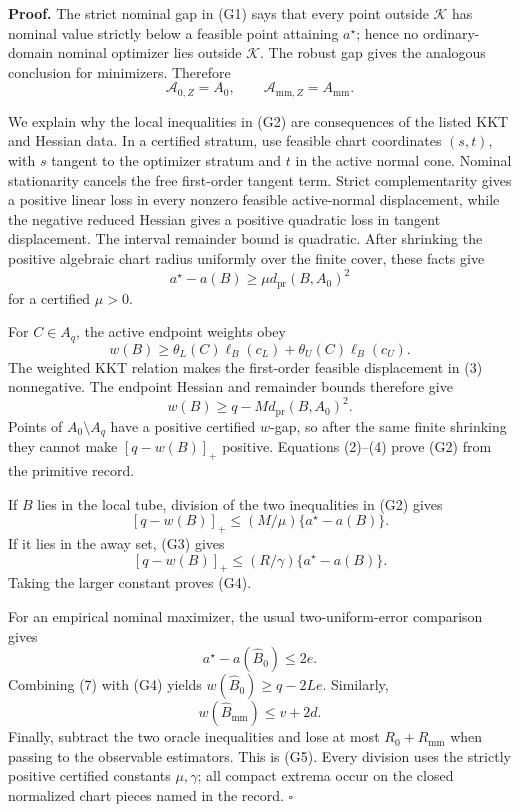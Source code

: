 \textbf{Proof.}
The strict nominal gap in (G1) says that every point outside \(\mathcal K\) has nominal value strictly below a feasible point attaining \(a^\star\); hence no ordinary-domain nominal optimizer lies outside \(\mathcal K\).  The robust gap gives the analogous conclusion for minimizers.  Therefore
\[
\mathcal A_{0,Z}=A_0,
\qquad
\mathcal A_{\mathrm{mm},Z}=A_{\mathrm{mm}}.
\tag{1}
\]

We explain why the local inequalities in (G2) are consequences of the listed KKT and Hessian data.  In a certified stratum, use feasible chart coordinates \((s,t)\), with \(s\) tangent to the optimizer stratum and \(t\) in the active normal cone.  Nominal stationarity cancels the free first-order tangent term.  Strict complementarity gives a positive linear loss in every nonzero feasible active-normal displacement, while the negative reduced Hessian gives a positive quadratic loss in tangent displacement.  The interval remainder bound is quadratic.  After shrinking the positive algebraic chart radius uniformly over the finite cover, these facts give
\[
a^\star-a(B)\ge\mu d_{\mathrm{pr}}(B,A_0)^2
\tag{2}
\]
for a certified \(\mu>0\).

For \(C\in A_q\), the active endpoint weights obey
\[
w(B)\ge\theta_L(C)\ell_B(c_L)+\theta_U(C)\ell_B(c_U).
\tag{3}
\]
The weighted KKT relation makes the first-order feasible displacement in (3) nonnegative.  The endpoint Hessian and remainder bounds therefore give
\[
w(B)\ge q-Md_{\mathrm{pr}}(B,A_0)^2.
\tag{4}
\]
Points of \(A_0\setminus A_q\) have a positive certified \(w\)-gap, so after the same finite shrinking they cannot make \([q-w(B)]_+\) positive.  Equations (2)--(4) prove (G2) from the primitive record.

If \(B\) lies in the local tube, division of the two inequalities in (G2) gives
\[
[q-w(B)]_+\le(M/\mu)\{a^\star-a(B)\}.
\tag{5}
\]
If it lies in the away set, (G3) gives
\[
[q-w(B)]_+\le(R/\gamma)\{a^\star-a(B)\}.
\tag{6}
\]
Taking the larger constant proves (G4).

For an empirical nominal maximizer, the usual two-uniform-error comparison gives
\[
a^\star-a(\widehat B_0)\le2e.
\tag{7}
\]
Combining (7) with (G4) yields \(w(\widehat B_0)\ge q-2Le\).  Similarly,
\[
w(\widehat B_{\mathrm{mm}})\le v+2d.
\tag{8}
\]
Finally, subtract the two oracle inequalities and lose at most \(R_0+R_{\mathrm{mm}}\) when passing to the observable estimators.  This is (G5).  Every division uses the strictly positive certified constants \(\mu,\gamma\); all compact extrema occur on the closed normalized chart pieces named in the record. \(\square\)